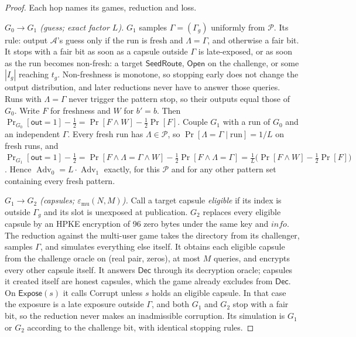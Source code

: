 \documentclass[pdflatex,sn-mathphys-num]{sn-jnl}
\theoremstyle{plain}
\theoremstyle{definition}
\newcommand{\Adv}{\operatorname{Adv}}
\begin{document}
\begin{proof}
Each hop names its games, reduction and loss.

\emph{$G_0\to G_1$ (guess; exact factor $L$).} $G_1$ samples $\Gamma=(\Gamma_g)$ uniformly from $\mathcal P$. Its rule: output $\mathcal A$'s guess only if the run is fresh and $\Lambda=\Gamma$, and otherwise a fair bit. It stops with a fair bit as soon as a capsule outside $\Gamma$ is late-exposed, or as soon as the run becomes non-fresh: a target $\mathsf{SeedRoute}$, $\mathsf{Open}$ on the challenge, or some $|I_g|$ reaching $t_g$. Non-freshness is monotone, so stopping early does not change the output distribution, and later reductions never have to answer those queries. Runs with $\Lambda=\Gamma$ never trigger the pattern stop, so their outputs equal those of $G_0$. Write $F$ for freshness and $W$ for $b'=b$. Then $\Pr_{G_0}[\mathsf{out}=1]-\tfrac12=\Pr[F\wedge W]-\tfrac12\Pr[F]$. Couple $G_1$ with a run of $G_0$ and an independent $\Gamma$. Every fresh run has $\Lambda\in\mathcal P$, so $\Pr[\Lambda=\Gamma\mid\text{run}]=1/L$ on fresh runs, and
$\Pr_{G_1}[\mathsf{out}=1]-\tfrac12=\Pr[F\wedge\Lambda{=}\Gamma\wedge W]-\tfrac12\Pr[F\wedge\Lambda{=}\Gamma]=\tfrac1L\big(\Pr[F\wedge W]-\tfrac12\Pr[F]\big)$.
Hence $\Adv_0=L\cdot\Adv_1$ exactly, for this $\mathcal P$ and for any other pattern set containing every fresh pattern.

\emph{$G_1\to G_2$ (capsules; $\varepsilon_{\mathrm{mu}}(N,M)$).} Call a target capsule \emph{eligible} if its index is outside $\Gamma_g$ and its slot is unexposed at publication. $G_2$ replaces every eligible capsule by an HPKE encryption of 96 zero bytes under the same key and $\mathit{info}$. The reduction against the multi-user game takes the directory from its challenger, samples $\Gamma$, and simulates everything else itself. It obtains each eligible capsule from the challenge oracle on (real pair, zeros), at most $M$ queries, and encrypts every other capsule itself. It answers $\mathsf{Dec}$ through its decryption oracle; capsules it created itself are honest capsules, which the game already excludes from $\mathsf{Dec}$. On $\mathsf{Expose}(s)$ it calls Corrupt unless $s$ holds an eligible capsule. In that case the exposure is a late exposure outside $\Gamma$, and both $G_1$ and $G_2$ stop with a fair bit, so the reduction never makes an inadmissible corruption. Its simulation is $G_1$ or $G_2$ according to the challenge bit, with identical stopping rules.


\end{proof}
\end{document}
